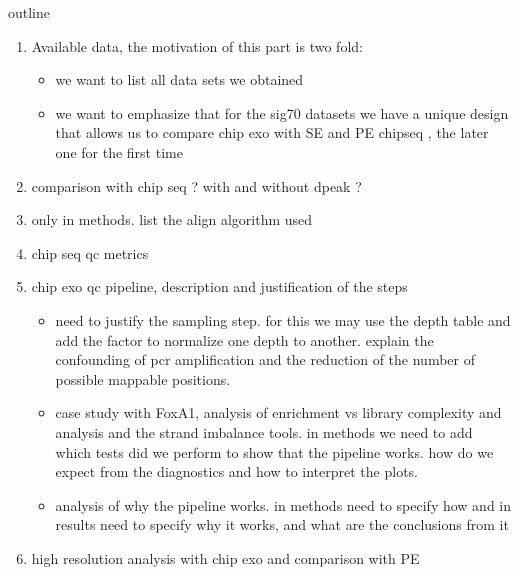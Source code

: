 \documentclass{bmcart}\usepackage[]{graphicx}\usepackage[]{color}
\begin{document}
\begin{frontmatter}
\begin{abstractbox}
\begin{keyword}
\end{keyword}

\end{abstractbox}

\end{frontmatter}


\newpage

\color{blue}

outline

\begin{enumerate}
\item Available data, the motivation of this part is two fold:
  \begin{itemize}
  \item we want to list all data sets we obtained
  \item we want to emphasize that for the sig70 datasets we have a
    unique design that allows us to compare chip exo with SE and PE
    chipseq , the later one for the first time
  \end{itemize}
\item comparison with chip seq ? with and without dpeak ?
\item only in methods. list the align algorithm used
\item chip seq qc metrics
\item chip exo qc pipeline, description and justification of the steps
\begin{itemize}
\item need to justify the sampling step. for this we may use the depth
  table and add the factor to normalize one depth to another. explain
  the confounding of pcr amplification and the reduction of the number
  of possible mappable positions.
\item case study with FoxA1, analysis of enrichment vs library
  complexity and analysis and the strand imbalance tools. in methods
  we need to add which tests did we perform to show that the pipeline
  works. how do we expect from the diagnostics and how to interpret
  the plots.
\item analysis of why the pipeline works. in methods need to specify
  how and in results need to specify why it works, and what are the
  conclusions from it
\end{itemize}
\item high resolution analysis with chip exo and comparison with PE

\end{enumerate}
\end{document}
